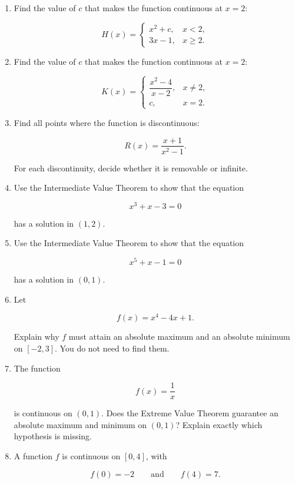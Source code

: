 \begin{enumerate}
\item Find the value of \(c\) that makes the function continuous at \(x=2\):

\[
H(x)=
\begin{cases}
x^2+c, & x<2,\\
3x-1, & x\ge2.
\end{cases}
\]

\item Find the value of \(c\) that makes the function continuous at \(x=2\):

\[
K(x)=
\begin{cases}
\dfrac{x^2-4}{x-2}, & x\neq2,\\[6pt]
c, & x=2.
\end{cases}
\]

\item Find all points where the function is discontinuous:

\[
R(x)=\frac{x+1}{x^2-1}.
\]

For each discontinuity, decide whether it is removable or infinite.

\item Use the Intermediate Value Theorem to show that the equation

\[
x^3+x-3=0
\]

has a solution in \((1,2)\).

\item Use the Intermediate Value Theorem to show that the equation

\[
x^5+x-1=0
\]

has a solution in \((0,1)\).

\item Let

\[
f(x)=x^4-4x+1.
\]

Explain why \(f\) must attain an absolute maximum and an absolute minimum on \([-2,3]\).  You do not need to find them.

\item The function

\[
f(x)=\frac1x
\]

is continuous on \((0,1)\).  Does the Extreme Value Theorem guarantee an absolute maximum and minimum on \((0,1)\)?  Explain exactly which hypothesis is missing.

\item A function \(f\) is continuous on \([0,4]\), with

\[
f(0)=-2
\qquad\text{and}\qquad
f(4)=7.
\]


\end{enumerate}
